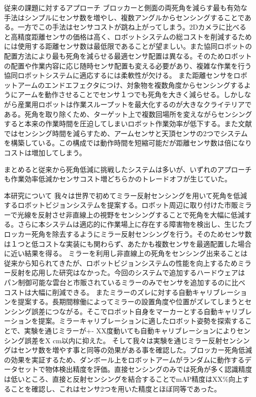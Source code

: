 \documentclass[xelatex,ja=standard]{bxjsarticle}
\begin{document}
従来の課題に対するアプローチ
ブロッカーと側面の両死角を減らす最も有効な手法はシンプルにセンサ数を増やし、複数アングルからセンシングすることである。一方でこの手法はセンサコストが跳ね上がってしまう。2Dカメラに比べると高精度距離センサ\cite{velodyne}\cite{ensenso}の価格は高く、ロボットシステムの総コストを削減するためには使用する距離センサ数は最低限であることが望ましい。また協同ロボットの配置方法により最も死角を減らせる最適センサ配置は異なる。そのためロボットの配置や作業内容に応じ随時センサ配置も変える必要があり、複雑な作業を行う協同ロボットシステムに適応するには柔軟性が欠ける。
また距離センサをロボットアームのエンドエフェクタにつけ、対象物を複数角度からセンシングするようにアームを動作させることでセンサ１つでも死角を大きく減らせる\cite{Schwarz2017}。しかしながら産業用ロボットは作業スループットを最大化するのが大きなクライテリアである。死角を取り除くため、ターゲット上で複数回場所を変えながらセンシングすると本来の作業時間を圧迫してしまいロボット作業効率が低下する。また文献\cite{Holz2015}ではセンシング時間を減らすため、アームセンサと天頂センサの2つでシステムを構築している。この構成では動作時間を短縮可能だが距離センサ数は倍になりコストは増加してしまう。

まとめると従来から死角低減に挑戦したシステムは多いが、いずれのアプローチも作業効率低減かセンサコスト増どちらかのトレードオフが生じていた。

本研究について
我々は世界で初めてミラー反射センシングを用いて死角を低減するロボットビジョンシステムを提案する。ロボット周辺に取り付けた市販ミラーで光線を反射させ非直線上の視野をセンシングすることで死角を大幅に低減する。さらに本システムは適応的に作業場上に存在する障害物を検出し、生じたブロッカー死角を除去するようにミラー反射センシングを行う。そのためセンサ数は１つと低コストな実装にも関わらず、あたかも複数センサを最適配置した場合に近い結果を得る。
ミラーを利用し非直線上の死角をセンシング出来ることは従来から知られてきたが、ロボットビジョンシステムの性能を向上するためミラー反射を応用した研究はなかった。今回のシステムで追加するハードウェアはパン制御可能な雲台と市販されているミラーのみでセンサを追加するのに比べコストは大幅に削減できる。
またミラーのズレに対する自動キャリブレーションを提案する。長期間稼働によってミラーの設置角度や位置がズレてしまうとセンシング誤差につながる。そこでロボット自身をマーカーとする自動キャリブレーションを提案。ミラーキャリブレーションに適したロボット姿勢を探索することで、実験を通じミラーが+- XX度動いても自動キャリブレーションによりセンシング誤差をX cm以内に抑えた。
そして我々は実験を通じミラー反射センシングはセンサ数を増やす事と同等の効果がある事を確認した。ブロッカー死角低減の効果を実証するため、ダンボール上をロボットアームがランダムに動作するデータセットで物体検出精度を評価。直接センシングのみでは死角が多く認識精度は低いところ、直接と反射センシングを結合することでmAP精度はXX\%向上することを確認し、これはセンサ2つを用いた精度とほぼ同等であった。
\end{document}
